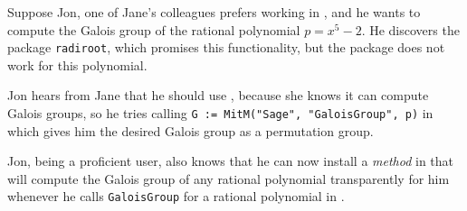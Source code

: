 Suppose Jon, one of Jane's colleagues prefers working in \GAP, and he wants to
compute the Galois group of the rational polynomial $p = x^5 - 2$.
He discovers the \GAP package \texttt{radiroot}, which promises this
functionality, but the package does not work for this polynomial.

Jon hears from Jane that he should use \Sage, because she knows it can compute
Galois groups, so he tries calling \lstinline|G := MitM("Sage", "GaloisGroup", p)|
in \GAP which gives him the desired Galois group as a \GAP permutation group.

Jon, being a proficient \GAP user, also knows that he can now install a \emph{method}
in \GAP that will compute the Galois group of any rational polynomial
transparently for him whenever he calls \lstinline|GaloisGroup| for a rational
polynomial in \GAP. 




